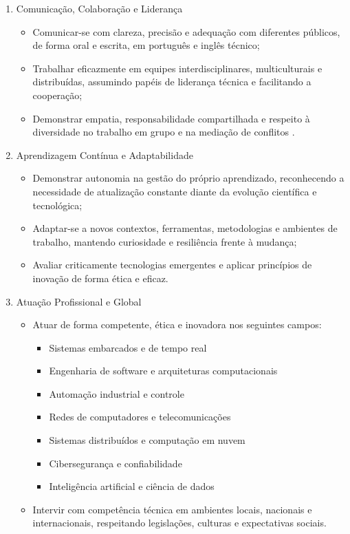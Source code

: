 \begin{enumerate}
\item Comunicação, Colaboração e Liderança

\begin{itemize}
    \item Comunicar-se com clareza, precisão e adequação com diferentes públicos, de forma oral e escrita, em português e inglês técnico;
    \item Trabalhar eficazmente em equipes interdisciplinares, multiculturais e distribuídas, assumindo papéis de liderança técnica e facilitando a cooperação;
    \item Demonstrar empatia, responsabilidade compartilhada e respeito à diversidade no trabalho em grupo e na mediação de conflitos .
\end{itemize}
    
\item Aprendizagem Contínua e Adaptabilidade
    
\begin{itemize}
    \item Demonstrar autonomia na gestão do próprio aprendizado, reconhecendo a necessidade de atualização constante diante da evolução científica e tecnológica;
    \item Adaptar-se a novos contextos, ferramentas, metodologias e ambientes de trabalho, mantendo curiosidade e resiliência frente à mudança;
    \item Avaliar criticamente tecnologias emergentes e aplicar princípios de inovação de forma ética e eficaz.
\end{itemize}
    
\item Atuação Profissional e Global
    
\begin{itemize}
    \item Atuar de forma competente, ética e inovadora nos seguintes campos:
    
    \begin{itemize}
        \item Sistemas embarcados e de tempo real
        \item Engenharia de software e arquiteturas computacionais
        \item Automação industrial e controle
        \item Redes de computadores e telecomunicações
        \item Sistemas distribuídos e computação em nuvem
        \item Cibersegurança e confiabilidade
        \item Inteligência artificial e ciência de dados
    \end{itemize}
    
    \item Intervir com competência técnica em ambientes locais, nacionais e internacionais, respeitando legislações, culturas e expectativas sociais.
\end{itemize}
\end{enumerate}

